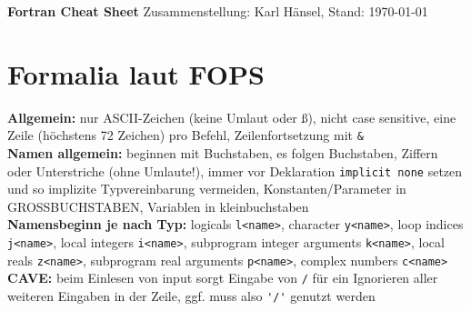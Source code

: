 \documentclass[a4paper, twocolumn]{scrarticle}
\begin{document}
  
  {\Huge \textbf{\textsf{Fortran Cheat Sheet}}}
  Zusammenstellung: Karl Hänsel, Stand: \today
  \section{Formalia laut FOPS}
  \textbf{Allgemein:} nur ASCII-Zeichen (keine Umlaut oder ß), nicht case sensitive, eine Zeile (höchstens 72 Zeichen) pro Befehl, Zeilenfortsetzung mit \lstinline|&|\\
 \textbf{ Namen allgemein:} beginnen mit Buchstaben, es folgen Buchstaben, Ziffern oder Unterstriche (ohne Umlaute!), immer vor Deklaration \lstinline|implicit none| setzen und so implizite Typvereinbarung vermeiden, Konstanten/Parameter in GROSSBUCHSTABEN, Variablen in kleinbuchstaben\\
 \textbf{Namensbeginn je nach Typ:} logicals \lstinline|l<name>|, character \lstinline|y<name>|, loop indices \lstinline|j<name>|, local integers \lstinline|i<name>|, subprogram integer arguments \lstinline|k<name>|, local reals \lstinline|z<name>|, subprogram real arguments \lstinline|p<name>|, complex numbers \lstinline|c<name>|
 \textbf{CAVE:} beim Einlesen von input sorgt Eingabe von \lstinline|/| für ein Ignorieren aller weiteren Eingaben in der Zeile, ggf. muss also \lstinline|'/'| genutzt werden
\end{document}
